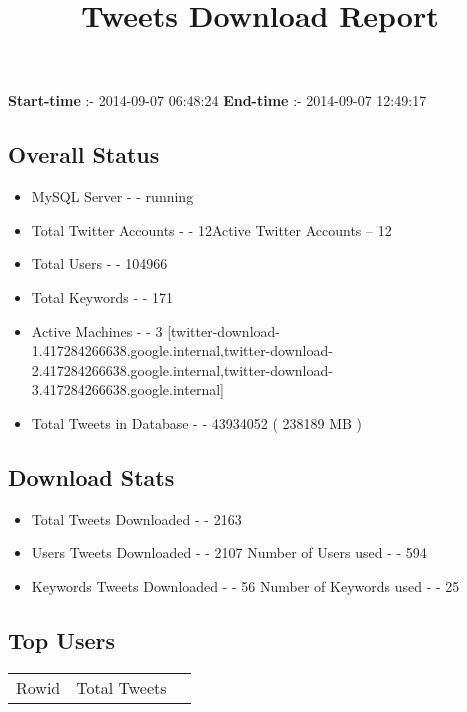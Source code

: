 \documentclass{article}\usepackage[T1]{fontenc}
\begin{document}
\title{\textbf{Tweets Download Report}}
               \date{}
                \maketitle
               \centerline{\textbf{Start-time} :- 2014-09-07 06:48:24 \hspace{40pt} \textbf{End-time} :- 2014-09-07 12:49:17}               \subsection*{Overall Status}                \begin{itemize}                \item MySQL Server - - running               \item Total Twitter Accounts - - 12\newline Active Twitter Accounts -- 12               \item Total Users - - 104966               \item Total Keywords - - 171               \item Active Machines - - 3 [twitter-download-1.417284266638.google.internal,twitter-download-2.417284266638.google.internal,twitter-download-3.417284266638.google.internal]               \item Total Tweets in Database - - 43934052 ( 238189 MB )               \end{itemize}               \subsection*{Download Stats}                \begin{itemize}                \item Total Tweets Downloaded - - 2163               \item Users Tweets Downloaded - - 2107 \newline Number of Users used - - 594               \item Keywords Tweets Downloaded - - 56 \newline Number of Keywords used - - 25              \end{itemize}              \subsection*{Top Users}\begin{tabular}{|c|c|c|}         \hline         Rowid & Total Tweets \\ 

\end{tabular}
\end{document}
